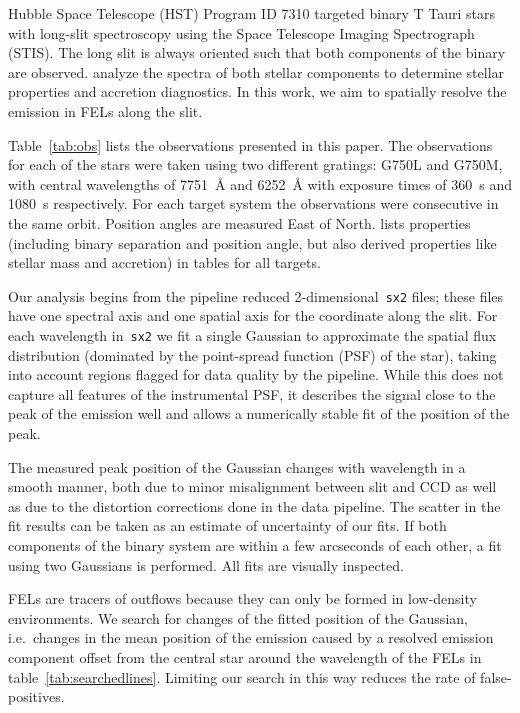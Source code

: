 \documentclass[twocolumn,trackchanges]{aastex63}
\begin{document}


Hubble Space Telescope (HST) Program ID 7310 targeted binary T Tauri
stars with long-slit spectroscopy using the Space Telescope Imaging
Spectrograph (STIS). The long slit is always oriented such that both
components of the binary are observed. \citet{2003ApJ...583..334H} analyze the
spectra of both stellar components to determine stellar properties and
accretion diagnostics. In this work, we aim to spatially resolve the
emission in FELs along the slit.

Table~\ref{tab:obs} lists the observations presented in this paper. The
observations for each of the stars were taken using two different gratings:
G750L and G750M, with central wavelengths of 7751~\AA{} and 6252~\AA{} with
exposure times of 360~s and 1080~s respectively. For each target system the observations were consecutive in the same orbit. Position angles are measured East of North. \citet{2003ApJ...583..334H} lists properties (including binary separation and position angle, but also derived properties like stellar mass and accretion) in tables for all targets.

Our analysis begins from the pipeline reduced
2-dimensional~\texttt{sx2} files; these files have one spectral axis and
one spatial axis for the coordinate along the slit. For each wavelength
in~\texttt{sx2} we fit a single Gaussian to approximate the spatial flux distribution (dominated by the point-spread function (PSF) of the star), taking into account regions
flagged for data quality by the pipeline. While this does not capture
all features of the instrumental PSF, it describes the signal close to the
peak of the emission well and allows a numerically stable fit of the
position of the peak.

The measured peak position  of the Gaussian changes with
wavelength in a smooth manner, both due to minor misalignment between slit and CCD as well as due to the distortion corrections done in the data
pipeline. The scatter in the fit results can be
taken as an estimate of uncertainty of our fits.
If both components of the binary system are within a few arcseconds of
each other, a fit using two Gaussians is performed. All fits are
visually inspected. 

FELs are tracers of outflows because they can only be formed in low-density
environments. We search for changes
of the fitted position of the Gaussian, i.e.\ changes in the mean
position of the emission caused by a resolved emission component offset from
the central star around the wavelength of the FELs in table~\ref{tab:searchedlines}. Limiting our search in this way reduces the
rate of false-positives. 
\end{document}
